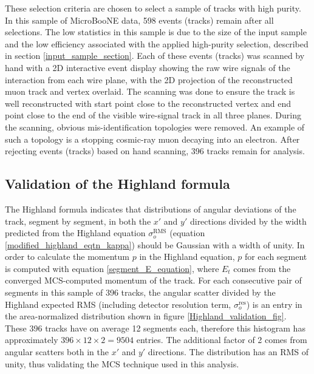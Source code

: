 \documentclass[a4paper,11pt]{article}
\begin{document}
These selection criteria are chosen to select a sample of tracks with high purity. In this sample of MicroBooNE data, 598 events (tracks) remain after all selections. The low statistics in this sample is due to the size of the input sample and the low efficiency associated with the applied high-purity selection, described in section \ref{input_sample_section}. Each of these events (tracks) was scanned by hand with a 2D interactive event display showing the raw wire signals of the interaction from each wire plane, with the 2D projection of the reconstructed muon track and vertex overlaid. The scanning was done to ensure the track is well reconstructed with start point close to the reconstructed vertex and end point close to the end of the visible wire-signal track in all three planes. During the scanning, obvious mis-identification topologies were removed. An example of such a topology is a stopping cosmic-ray muon decaying into an electron. After rejecting events (tracks) based on hand scanning, 396 tracks remain for analysis.


\subsection{Validation of the Highland formula}\label{highland_validation_section}
The Highland formula indicates that distributions of angular deviations of the track, segment by segment, in both the $x'$ and $y'$ directions divided by the width predicted from the Highland equation $\sigma_o^{\text{RMS}}$ (equation \ref{modified_highland_eqtn_kappa}) should be Gaussian with a width of unity. In order to calculate the momentum $p$ in the Highland equation, $p$ for each segment is computed with equation \ref{segment_E_equation}, where $E_t$ comes from the converged MCS-computed momentum of the track. For each consecutive pair of segments in this sample of 396 tracks, the angular scatter divided by the Highland expected RMS (including detector resolution term, $\sigma_o^{\text{res}}$) is an entry in the area-normalized distribution shown in figure \ref{Highland_validation_fig}. These 396 tracks have on average 12 segments each, therefore this histogram has approximately $396\times12\times2=9504$ entries. The additional factor of 2 comes from angular scatters both in the $x'$ and $y'$ directions. The distribution has an RMS of unity, thus validating the MCS technique used in this analysis.
\end{document}
